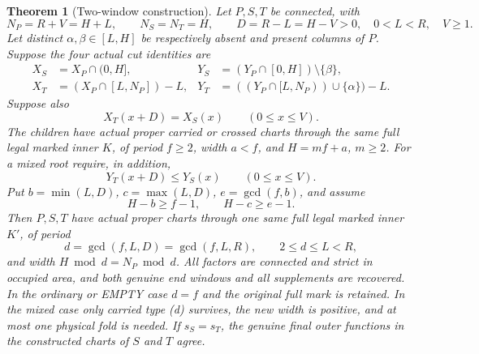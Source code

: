 \documentclass[11pt,a4paper]{amsart}
\numberwithin{equation}{section}
\theoremstyle{plain}
\newtheorem{theorem}{Theorem}[section]
\theoremstyle{definition}
\begin{document}
\begin{theorem}[Two-window construction]\label{ge:two-window}
Let \(P,S,T\) be connected, with
\[
 N_P=R+V=H+L,\qquad N_S=N_T=H,\qquad
 D=R-L=H-V>0,\quad 0<L<R,\quad V\ge1.
\]
Let distinct \(\alpha,\beta\in[L,H]\) be respectively absent and
present columns of \(P\).  Suppose the four actual cut identities are
\begin{equation}\label{ge:eq:two-cuts}
\begin{aligned}
 X_S&=X_P\cap(0,H],&Y_S&=(Y_P\cap[0,H])\setminus\{\beta\},\\
 X_T&=(X_P\cap[L,N_P])-L,&
 Y_T&=((Y_P\cap[L,N_P))\cup\{\alpha\})-L.
\end{aligned}
\end{equation}
Suppose also
\begin{equation}\label{ge:eq:negative-window}
 X_T(x+D)=X_S(x)\qquad(0\le x\le V).
\end{equation}
The children have actual proper carried or crossed charts through the same
full legal marked inner \(K\), of period \(f\ge2\), width \(a<f\),
and \(H=mf+a\), \(m\ge2\).  For a mixed root require, in addition,
\begin{equation}\label{ge:eq:column-inequality}
 Y_T(x+D)\le Y_S(x)\qquad(0\le x\le V).
\end{equation}
Put \(b=\min(L,D)\), \(c=\max(L,D)\), \(e=\gcd(f,b)\), and assume
\begin{equation}\label{ge:eq:coverage}
 H-b\ge f-1,\qquad H-c\ge e-1.
\end{equation}
Then \(P,S,T\) have actual proper charts through one same full legal
marked inner \(K'\), of period
\[
 d=\gcd(f,L,D)=\gcd(f,L,R),\qquad 2\le d\le L<R,
\]
and width \(H\bmod d=N_P\bmod d\).  All factors are connected and
strict in occupied area, and both genuine end windows and all supplements
are recovered.  In the ordinary or EMPTY case \(d=f\) and the original
full mark is retained.  In the mixed case only carried type (d) survives,
the new width is positive, and at most one physical fold is needed.
If \(s_S=s_T\), the genuine final outer functions in the constructed
charts of \(S\) and \(T\) agree.
\end{theorem}
\end{document}
